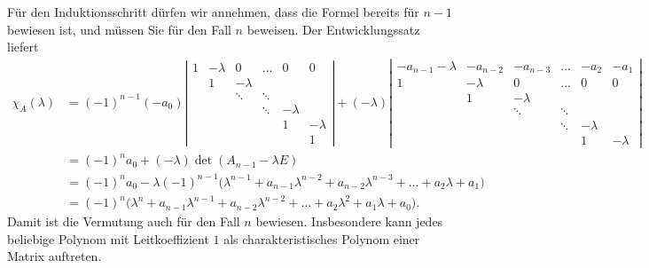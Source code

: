 \begin{loesung}
Für den Induktionsschritt dürfen wir annehmen, dass die Formel bereits
für $n-1$ bewiesen ist, und müssen Sie für den Fall $n$ beweisen.
Der Entwicklungssatz liefert
\begin{align*}
\chi_A(\lambda)
&=
(-1)^{n-1}(-a_0)\left|\begin{matrix}
   1            &-\lambda&   0    &\dots &   0    &   0    \\
                &   1    &-\lambda&      &        &        \\
                &        &\ddots  &\ddots&        &        \\
                &        &        &\ddots&-\lambda&        \\
                &        &        &      &   1    &-\lambda\\
                &        &        &      &        &   1    
\end{matrix}\right|
+(-\lambda)\left|\begin{matrix}
-a_{n-1}-\lambda&-a_{n-2}&-a_{n-3}&\dots & -a_2   & -a_1   \\
   1            &-\lambda&   0    &\dots &   0    &   0    \\
                &   1    &-\lambda&      &        &        \\
                &        &\ddots  &\ddots&        &        \\
                &        &        &\ddots&-\lambda&        \\
                &        &        &      &   1    &-\lambda
\end{matrix}\right|
\\
&=(-1)^n a_0 + (-\lambda)\det(A_{n-1}-\lambda E)
\\
&=(-1)^n a_0 -\lambda (-1)^{n-1}
\bigl(
\lambda^{n-1}+a_{n-1}\lambda^{n-2}+a_{n-2}\lambda^{n-3}+\dots+a_2\lambda+a_1
\bigr)
\\
&=(-1)^n\bigl(
\lambda^n+a_{n-1}\lambda^{n-1}+a_{n-2}\lambda^{n-2}+\dots+a_2\lambda^2+a_1\lambda+a_0
\bigr).
\end{align*}
Damit ist die Vermutung auch für den Fall $n$ bewiesen.
Insbesondere kann jedes beliebige Polynom mit Leitkoeffizient $1$
als charakteristisches Polynom einer Matrix auftreten.
\end{loesung}

